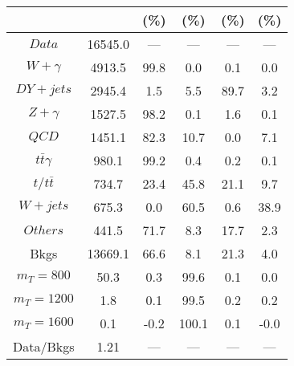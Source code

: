\begin{figure}
\begin{minipage}[c]{0.32\textwidth}
{\begin{tabular}{cccccc}
 &  & (\%) & (\%) & (\%) & (\%)  \\
\hline
                                                                      $ Data $ &  16545.0 &  --- &  --- &  --- &  ---\\
$ W+\gamma $ &  4913.5 &  99.8 &  0.0 &  0.1 &  0.0\\
$ DY+jets $ &  2945.4 &  1.5 &  5.5 &  89.7 &  3.2\\
$ Z+\gamma $ &  1527.5 &  98.2 &  0.1 &  1.6 &  0.1\\
$ QCD $ &  1451.1 &  82.3 &  10.7 &  0.0 &  7.1\\
$ t\bar{t}\gamma $ &  980.1 &  99.2 &  0.4 &  0.2 &  0.1\\
$ t/t\bar{t} $ &  734.7 &  23.4 &  45.8 &  21.1 &  9.7\\
$ W+jets $ &  675.3 &  0.0 &  60.5 &  0.6 &  38.9\\
$ Others $ &  441.5 &  71.7 &  8.3 &  17.7 &  2.3\\
Bkgs &  13669.1 &  66.6 &  8.1 &  21.3 &  4.0\\
$ m_{T} = 800 $ &  50.3 &  0.3 &  99.6 &  0.1 &  0.0\\
$ m_{T} = 1200 $ &  1.8 &  0.1 &  99.5 &  0.2 &  0.2\\
$ m_{T} = 1600 $ &  0.1 &  -0.2 &  100.1 &  0.1 &  -0.0\\
Data/Bkgs &  1.21 &  --- &  --- &  --- &  ---\\
\hline
\end{tabular}
}
\end{minipage}
\end{figure}

